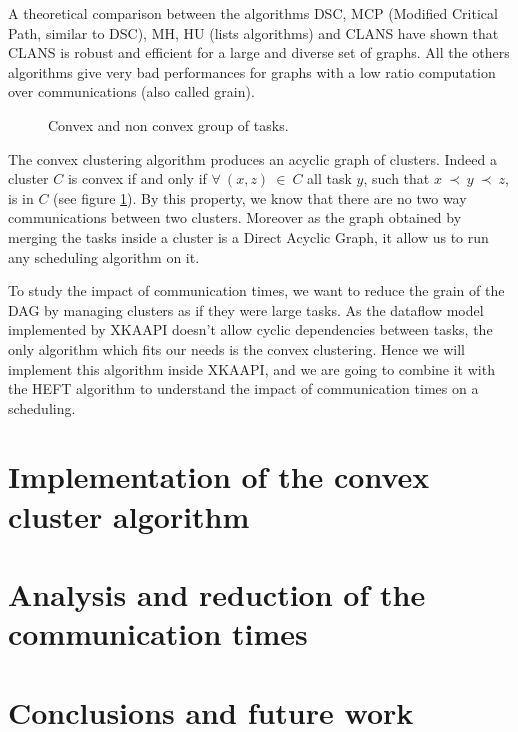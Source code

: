 \documentclass[10pt, conference, compsocconf]{IEEEtran}
\begin{document}
A theoretical comparison\cite{khan1994comparison} between the algorithms DSC,
MCP (Modified Critical Path, similar to DSC), MH, HU (lists algorithms) and CLANS
have shown that CLANS is robust and efficient for a large and diverse set of
graphs. All the others algorithms give very bad performances for graphs with a
low ratio computation over communications (also called grain).

\begin{figure}[htb]
    \centering
    \caption{Convex and non convex group of tasks.}
    \label{fig:conv}
\end{figure}


The convex clustering algorithm\cite{lepere2002new} produces an acyclic graph
of clusters.  Indeed a cluster $C$ is convex if and only if $\forall\ (x,z)\
\in\ C$ all task $y$, such that $x\ \prec\ y\ \prec\ z$, is in $C$ (see
figure \ref{fig:conv}). By this property, we know that there are no two way
communications between two clusters. Moreover as the graph obtained by merging
the tasks inside a cluster is a Direct Acyclic Graph, it allow us to run
any scheduling algorithm on it.

To study the impact of communication times, we want to reduce the grain of
the DAG by managing clusters as if they were large tasks. As  the dataflow
model implemented by XKAAPI doesn't allow cyclic dependencies between tasks,
the only algorithm which fits our needs is the convex clustering. Hence we
will implement this algorithm inside XKAAPI, and we are going to combine it
with the HEFT algorithm to understand the impact of communication times on a
scheduling. 


\section{Implementation of the convex cluster algorithm}
\section{Analysis and reduction of the communication times}
\section{Conclusions and future work}








\end{document}
